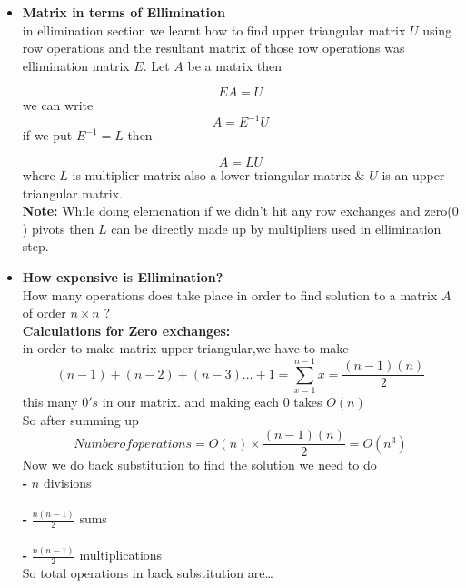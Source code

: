 \documentclass[a4paper,11pt]{article}
\numberwithin{equation}{section}
\begin{document}
\begin{itemize}
    \item \textbf{Matrix in terms of Ellimination}\\
    
    in ellimination section we learnt how to find upper triangular matrix $U$ using row operations and the resultant matrix of those row operations was ellimination matrix $E$.
    Let $A$ be a matrix then 

    \begin{equation}
        EA=U
    \end{equation}
we can write 
    \begin{equation}
        A=E^{-1}U
    \end{equation}
if we put $E^{-1}=L$ then 

\begin{equation}
    A=LU
\end{equation}
where $L$ is multiplier matrix also a lower  triangular matrix \& $U$ is an upper triangular matrix.\\

\textbf{Note: }While doing elemenation if we didn't hit any row exchanges and zero($0$) pivots then $L$ can be directly made up by multipliers used in ellimination step.\\

\item \textbf{How expensive is Ellimination?}\\

How many operations does take place in order to find solution to a matrix $A$ of order $n \times n$ ?\\

\textbf{Calculations for Zero exchanges: }\\
    in order to make matrix upper triangular,we have to make 
    \begin{equation}
        (n-1)+(n-2)+(n-3)\dots+1=\sum_{x=1}^{n-1}x=\frac{(n-1)(n)}{2}
    \end{equation}
this many $0's$ in our matrix. and making each $0$ takes $O(n)$\\
So after summing up
    \begin{equation}
        Number of operations=O(n)\times \frac{(n-1)(n)}{2}=O(n^3)
    \end{equation}
Now we do back substitution to find the solution we need to do\\

\textbf{-} $n$ divisions\\
\\
\textbf{-} $\frac{n(n-1)}{2}$ sums\\
\\
\textbf{-} $\frac{n(n-1)}{2}$ multiplications\\
So total operations in back substitution are\dots



\end{itemize}
\end{document}
